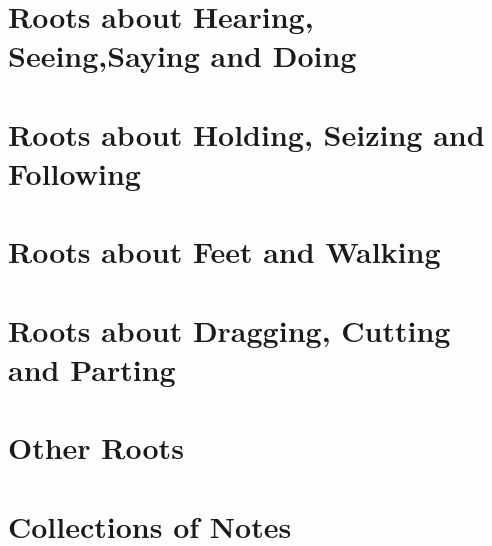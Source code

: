 \ifdefined\printvocabulary

\part{Roots about Hearing, Seeing,Saying and Doing}







\part{Roots about Holding, Seizing and Following}




\part{Roots about Feet and Walking} 







\part{Roots about Dragging, Cutting and Parting}








\part{Other Roots}













\part{Collections of Notes}







\fi